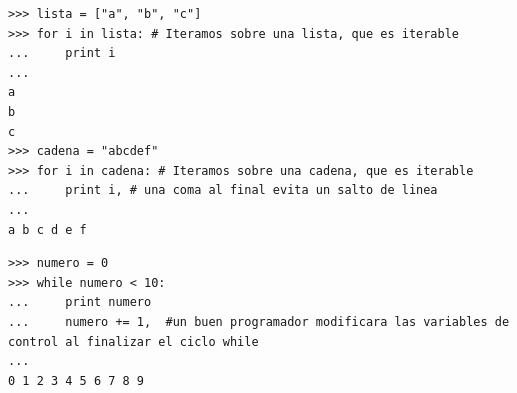 \begin{lstlisting}
>>> lista = ["a", "b", "c"]
>>> for i in lista: # Iteramos sobre una lista, que es iterable
...     print i
...
a
b
c
>>> cadena = "abcdef"
>>> for i in cadena: # Iteramos sobre una cadena, que es iterable
...     print i, # una coma al final evita un salto de linea
...
a b c d e f
\end{lstlisting}



\begin{lstlisting}
>>> numero = 0
>>> while numero < 10:
...     print numero
...     numero += 1,  #un buen programador modificara las variables de control al finalizar el ciclo while
...
0 1 2 3 4 5 6 7 8 9
\end{lstlisting}


% 
%  
%  
% 
% 
% 





